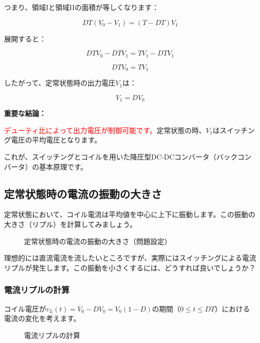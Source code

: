 つまり、領域Iと領域IIの面積が等しくなります：

\begin{equation}
DT(V_0 - V_1) = (T - DT)V_1
\end{equation}

展開すると：

\begin{equation}
DTV_0 - DTV_1 = TV_1 - DTV_1
\end{equation}

\begin{equation}
DTV_0 = TV_1
\end{equation}

したがって、定常状態時の出力電圧$V_1$は：

\begin{equation}
\boxed{V_1 = DV_0}
\end{equation}

\textbf{重要な結論：}

\textcolor{red}{デューティ比によって出力電圧が制御可能です。}定常状態の時、$V_1$はスイッチング電圧の平均電圧となります。

これが、スイッチングとコイルを用いた降圧型DC-DCコンバータ（バックコンバータ）の基本原理です。

\subsection{定常状態時の電流の振動の大きさ}

定常状態において、コイル電流は平均値を中心に上下に振動します。この振動の大きさ（リプル）を計算してみましょう。

\begin{figure}[H]
\centering
{}
\caption{定常状態時の電流の振動の大きさ（問題設定）}
\label{fig:ch04_inductor_ripple_problem}
\end{figure}

理想的には直流電流を流したいところですが、実際にはスイッチングによる電流リプルが発生します。この振動を小さくするには、どうすれば良いでしょうか？

\subsubsection{電流リプルの計算}

コイル電圧が$v_L(t) = V_0 - DV_0 = V_0(1-D)$の期間（$0 \leq t \leq DT$）における電流の変化を考えます。

\begin{figure}[H]
\centering
{}
\caption{電流リプルの計算}
\label{fig:ch04_inductor_ripple_calc}
\end{figure}

